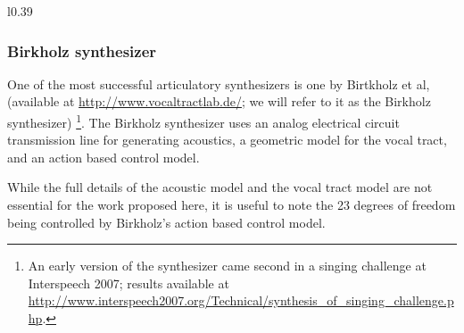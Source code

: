 \documentclass{article}
\begin{document}
\begin{wrapfigure}{l}{0.39\textwidth}
  \vspace{-30pt}
  \begin{center}
  \end{center}
  \vspace{-24pt}
\end{wrapfigure}

\subsubsection{Birkholz synthesizer}

One of the most successful articulatory synthesizers
is one by Birtkholz et al,
(available at \url{http://www.vocaltractlab.de/};
we will refer to it as the Birkholz synthesizer)%
\footnote{An early version of the synthesizer
came second in a singing challenge
at Interspeech 2007; results available at
\url{http://www.interspeech2007.org/Technical/synthesis_of_singing_challenge.php}.}.
The Birkholz synthesizer uses
an analog electrical circuit transmission line
for generating acoustics,
a geometric model for the vocal tract,
and an action based control model.

While the full details of the acoustic model
and the vocal tract model are not
essential for the work proposed here,
it is useful to note
the 23 degrees of freedom
being controlled by Birkholz's
action based control model.
\end{document}
